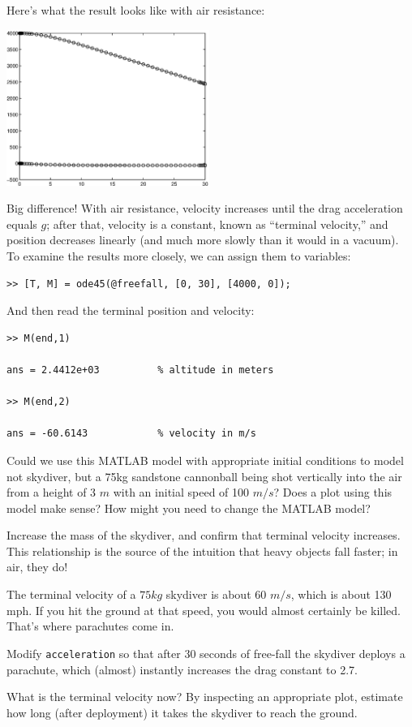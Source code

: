 \documentclass[
]{book}
\begin{document}
Here's what the result looks like with air resistance:

\beforefig \centerline{\includegraphics[height=2in]{figs/freefall2.eps}}

Big difference!  With air resistance, velocity increases until
the drag acceleration equals $g$; after that, velocity is a constant,
known as ``terminal velocity,'' and position decreases linearly
(and much more slowly than it would in a vacuum).  To examine
the results more closely, we can assign them to variables:


\begin{verbatim}
>> [T, M] = ode45(@freefall, [0, 30], [4000, 0]);
\end{verbatim}

And then read the terminal position and velocity:

\begin{verbatim}
>> M(end,1)

ans = 2.4412e+03          % altitude in meters

>> M(end,2)

ans = -60.6143            % velocity in m/s
\end{verbatim}

\begin{ex}
	Could we use this MATLAB model with appropriate initial conditions 
	to model not skydiver, but a  
	75kg sandstone cannonball being shot vertically into the air from a height of
	3 $m$ with an initial speed of 100 $m/s$?  Does a plot using this model
	make sense?  How might you need to change the
	MATLAB model?
\end{ex}

\begin{ex}
Increase the mass of the skydiver, and confirm that
terminal velocity increases.  This relationship is the source of the
intuition that heavy objects fall faster; in air, they do!
\end{ex}

\begin{ex}
The terminal velocity of a $75
kg$ skydiver is about 60 $m/s$, which is about 130 mph.  If you hit
the ground at that speed, you would almost certainly be killed.
That's where parachutes come in.

Modify {\tt acceleration} so that after 30 seconds of
free-fall the skydiver deploys a parachute, which (almost) instantly
    increases the drag constant to 2.7. 

What is the terminal velocity now?  By inspecting an appropriate plot, estimate 
how long (after deployment)
it takes the skydiver to reach the ground.
\end{ex}
\end{document}
